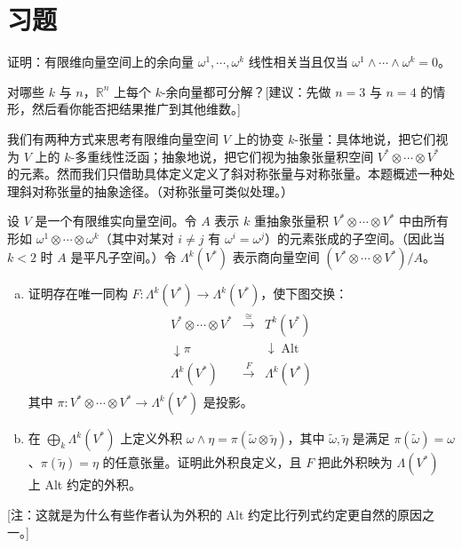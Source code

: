\documentclass[../../main.tex]{subfiles}
\begin{document}
\section{习题}\label{section:ch14-problems}

\begin{exercise}\label{exercise:ch14-01}
证明：有限维向量空间上的余向量 $\omega^1,\cdots ,\omega^k$ 线性相关当且仅当 $\omega^1\wedge\cdots\wedge\omega^k=0$。
\end{exercise}

\begin{exercise}\label{exercise:ch14-02}
对哪些 $k$ 与 $n$，$\mathbb{R}^n$ 上每个 $k$-余向量都可分解？[建议：先做 $n=3$ 与 $n=4$ 的情形，然后看你能否把结果推广到其他维数。]
\end{exercise}

\begin{exercise}\label{exercise:ch14-03}
我们有两种方式来思考有限维向量空间 $V$ 上的协变 $k$-张量：具体地说，把它们视为 $V$ 上的 $k$-多重线性泛函；抽象地说，把它们视为抽象张量积空间 $V^*\otimes\cdots\otimes V^*$ 的元素。然而我们只借助具体定义定义了斜对称张量与对称张量。本题概述一种处理斜对称张量的抽象途径。（对称张量可类似处理。）

设 $V$ 是一个有限维实向量空间。令 $A$ 表示 $k$ 重抽象张量积 $V^*\otimes\cdots\otimes V^*$ 中由所有形如 $\omega^1\otimes\cdots\otimes\omega^k$（其中对某对 $i\ne j$ 有 $\omega^i=\omega^j$）的元素张成的子空间。（因此当 $k<2$ 时 $A$ 是平凡子空间。）令 $\Lambda^k(V^*)$ 表示商向量空间 $(V^*\otimes\cdots\otimes V^*)/A$。
\begin{enumerate}[(a)]
\item 证明存在唯一同构 $F:\Lambda^k(V^*)\to\Lambda^k(V^*)$，使下图交换：
\begin{align*}
\begin{array}{ccc}
V^*\otimes\cdots\otimes V^*&\xrightarrow{\cong}&T^k(V^*)\\
\downarrow\pi&&\downarrow\operatorname{Alt}\\
\Lambda^k(V^*)&\xrightarrow{F}&\Lambda^k(V^*)
\end{array}
\end{align*}
其中 $\pi:V^*\otimes\cdots\otimes V^*\to\Lambda^k(V^*)$ 是投影。
\item 在 $\bigoplus_k\Lambda^k(V^*)$ 上定义外积 $\omega\wedge\eta=\pi(\widetilde\omega\otimes\widetilde\eta)$，其中 $\widetilde\omega,\widetilde\eta$ 是满足 $\pi(\widetilde\omega)=\omega$、$\pi(\widetilde\eta)=\eta$ 的任意张量。证明此外积良定义，且 $F$ 把此外积映为 $\Lambda(V^*)$ 上 Alt 约定的外积。
\end{enumerate}
[注：这就是为什么有些作者认为外积的 Alt 约定比行列式约定更自然的原因之一。]
\end{exercise}
\end{document}
